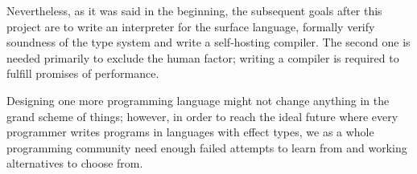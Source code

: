 \documentclass[a4paper,14pt]{extreport}
\begin{document}
Nevertheless, as it was said in the beginning, the subsequent goals after this
project are to write an interpreter for the surface language, formally verify
soundness of the type system and write a self-hosting compiler. The second one
is needed primarily to exclude the human factor; writing a compiler is required
to fulfill promises of performance.

Designing one more programming language might not change anything in the grand
scheme of things; however, in order to reach the ideal future where every
programmer writes programs in languages with effect types, we as a whole
programming community need enough failed attempts to learn from and working
alternatives to choose from.



\end{document}
